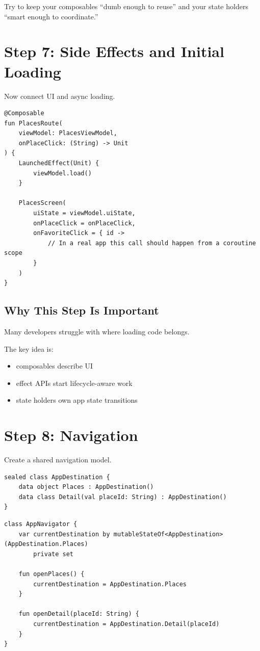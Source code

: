 \documentclass[11pt,a4paper]{article}
\begin{document}
Try to keep your composables ``dumb enough to reuse'' and your state holders ``smart enough to coordinate.''

\section{Step 7: Side Effects and Initial Loading}

Now connect UI and async loading.

\begin{lstlisting}[style=kazekotlin]
@Composable
fun PlacesRoute(
    viewModel: PlacesViewModel,
    onPlaceClick: (String) -> Unit
) {
    LaunchedEffect(Unit) {
        viewModel.load()
    }

    PlacesScreen(
        uiState = viewModel.uiState,
        onPlaceClick = onPlaceClick,
        onFavoriteClick = { id ->
            // In a real app this call should happen from a coroutine scope
        }
    )
}
\end{lstlisting}

\subsection{Why This Step Is Important}

Many developers struggle with where loading code belongs.

The key idea is:
\begin{itemize}
    \item composables describe UI
    \item effect APIs start lifecycle-aware work
    \item state holders own app state transitions
\end{itemize}

\section{Step 8: Navigation}

Create a shared navigation model.

\begin{lstlisting}[style=kazekotlin]
sealed class AppDestination {
    data object Places : AppDestination()
    data class Detail(val placeId: String) : AppDestination()
}
\end{lstlisting}

\begin{lstlisting}[style=kazekotlin]
class AppNavigator {
    var currentDestination by mutableStateOf<AppDestination>(AppDestination.Places)
        private set

    fun openPlaces() {
        currentDestination = AppDestination.Places
    }

    fun openDetail(placeId: String) {
        currentDestination = AppDestination.Detail(placeId)
    }
}
\end{lstlisting}
\end{document}
